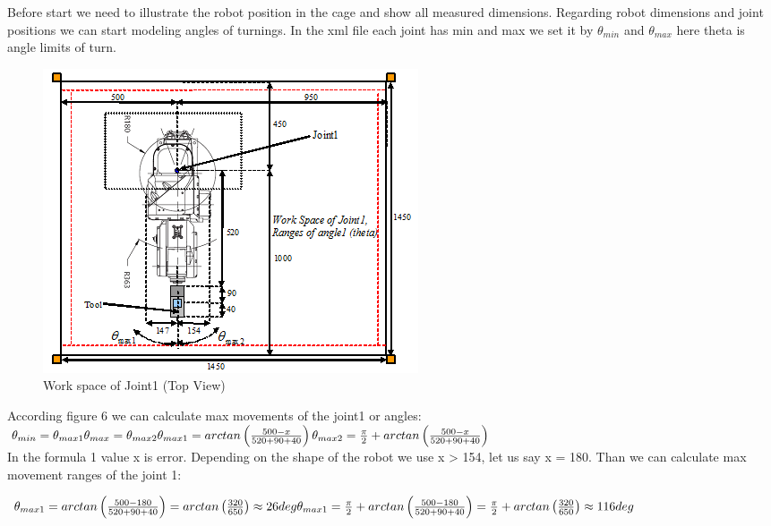 Before start we need to illustrate the robot position in the cage and show all measured dimensions. Regarding robot dimensions and joint positions we can start modeling angles of turnings. In the xml file each joint has min and max we set it by $\theta _{min}$ and $\theta _{max}$ here theta is angle limits of turn.

\begin{figure}[H]
  \centering
  \includegraphics[scale= 1]{source/JointWorkspaceDimensions.png}
  \caption{Work space of Joint1 (Top View)}
  \label{fig:JointWorkspaceDimensions}
\end{figure}

According figure 6 we can calculate max movements of the joint1 or angles: \\

\noindent$\theta _{min}=\theta _{max1}  \\
\theta _{max}=\theta _{max2}\\
\theta _{max1}=arctan\left ( \frac{500-x}{520+90+40} \right )\\
\theta _{max2}=\frac{\pi }{2}+arctan\left ( \frac{500-x}{520+90+40} \right )$\\

In the formula 1 value x is error. Depending on the shape of the robot we use x > 154, let us say x = 180. Than we can calculate max movement ranges of the joint 1:

\noindent$\theta _{max1}=arctan\left ( \frac{500-180}{520+90+40} \right )=arctan\left ( \frac{320}{650} \right )\approx 26deg \\
\theta _{max1}=\frac{\pi }{2}+arctan\left ( \frac{500-180}{520+90+40} \right )=\frac{\pi }{2}+arctan\left ( \frac{320}{650} \right )\approx 116deg$\\


